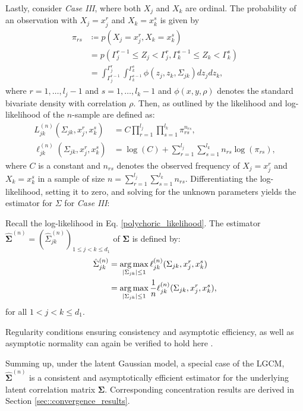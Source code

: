 Lastly, consider \textit{Case III}, where both $X_j$ and $X_k$ are ordinal. The probability of an observation with $X_j = x^r_j$ and $X_k = x^s_k$ is given by
\begin{equation}\label{cell_probabilities}
    \begin{split}
        \pi_{rs} &\coloneqq p(X_j = x^r_j, X_k = x^s_k) \\
        &= p(\Gamma_j^{r-1} \leq Z_j < \Gamma_j^r, \Gamma_k^{s-1} \leq Z_k < \Gamma_k^s) \\
        &= \int_{\Gamma_j^{r-1}}^{\Gamma_j^{r}} \int_{\Gamma_k^{s-1}}^{\Gamma_k^{s}} \phi(z_j,z_k,\Sigma_{jk}) dz_j dz_k,
    \end{split}
\end{equation}
where $r = 1, \dots, l_j-1$ and $s = 1, \dots, l_k-1$ and $\phi(x,y,\rho)$ denotes the standard bivariate density with correlation $\rho$. Then, as outlined by \citet{Olsson79} the likelihood and log-likelihood of the $n$-sample are defined as:
\begin{equation}\label{polychoric_likelihood}
    \begin{split}
        L_{jk}^{(n)}(\Sigma_{jk}, x_j^r,x_k^s) &= C \prod_{r=1}^{l_{{j}}} \prod_{s=1}^{l_{{k}}} \pi_{rs}^{n_{rs}}, \\
        \ell_{jk}^{(n)}(\Sigma_{jk}, x_j^r,x_k^s) &= \log(C) + \sum_{r=1}^{l_{{j}}}\sum_{s=1}^{l_{k}} n_{rs} \log(\pi_{rs}),
    \end{split}
\end{equation}
where $C$ is a constant and $n_{rs}$ denotes the observed frequency of $X_j = x^r_j$ and $X_k = x^s_k$ in a sample of size $n= \sum_{r=1}^{l_{{j}}}\sum_{s=1}^{l_{{k}}} n_{rs}$. Differentiating the log-likelihood, setting it to zero, and solving for the unknown parameters yields the estimator for $\Sigma$ for \textit{Case III}:
\begin{definition}\label{definition_case3}
    Recall the log-likelihood in Eq. \eqref{polychoric_likelihood}. The estimator $\hat{\mathbf{\Sigma}}^{(n)} = (\hat{\Sigma}_{jk}^{(n)})_{1\leq j < k\leq d_1}$ of $\mathbf{\Sigma}$ is defined by:
    \begin{equation}
        \begin{split}
            \hat{\Sigma}_{jk}^{(n)} &= \argmax_{\Abs{\Sigma_{jk}} \leq 1} \ell_{jk}^{(n)}(\Sigma_{jk}, x_j^r,x_k^s) \\
            &= \argmax_{\Abs{\Sigma_{jk}} \leq 1} \frac{1}{n} \ell_{jk}^{(n)}(\Sigma_{jk}, x_j^r,x_k^s),
        \end{split}
    \end{equation}
    for all $1 < j < k \leq d_1 $.
\end{definition}
\noindent Regularity conditions ensuring consistency and asymptotic efficiency, as well as asymptotic normality can again be verified to hold here \citep{Wallentin17}.

Summing up, under the latent Gaussian model, a special case of the LGCM, $\hat{\mathbf{\Sigma}}^{(n)}$ is a consistent and asymptotically efficient estimator for the underlying latent correlation matrix $\mathbf{\Sigma}$. Corresponding concentration results are derived in Section \ref{sec::convergence_results}.